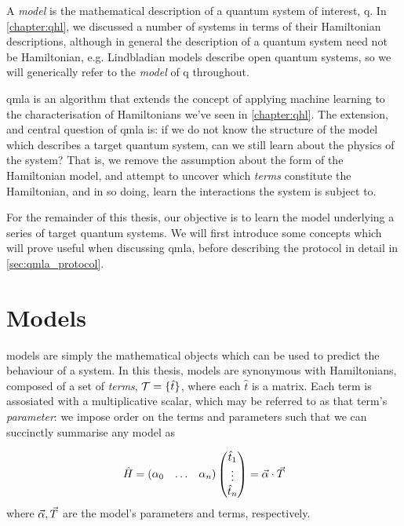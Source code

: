 \glsresetall

A \emph{model} is the mathematical description of a quantum system of interest, \gls{q}.
In \cref{chapter:qhl}, we discussed a number of systems in terms of their Hamiltonian descriptions,
    although in general the description of a quantum system need not be Hamiltonian, 
    e.g. Lindbladian models describe open quantum systems, 
    so we will generically refer to the \emph{\gls{model}} of \gls{q} throughout. 
\par 

\gls{qmla} is an algorithm that extends the concept of applying machine learning to the 
    characterisation of Hamiltonians we've seen in \cref{chapter:qhl}. 
The extension, and central question of \gls{qmla} is:
    if we do not know the structure of the model which describes a target quantum system, 
    can we still learn about the physics of the system?
That is, we remove the assumption about the form of the Hamiltonian model, 
    and attempt to uncover which \emph{\glspl{term}} constitute the Hamiltonian, 
    and in so doing, learn the interactions the system is subject to. 
\par 

For the remainder of this thesis, our objective is to learn the model underlying 
    a series of target quantum systems.
We will first introduce some concepts which will prove useful when discussing \gls{qmla}, 
    before describing the protocol in detail in \cref{sec:qmla_protocol}.


\section{Models}\label{sec:models}
\Glspl{model} are simply the mathematical objects which can be used to predict the behaviour of a system. 
In this thesis, \glspl{model} are synonymous with Hamiltonians,
    composed of a set of \emph{\glspl{term}}, $\mathcal{T} = \{ \hat{t} \}$, 
    where each $\hat{t}$ is a matrix. 
Each term is assosiated with a multiplicative scalar, which may be referred to as that term's \emph{parameter}: 
    we impose order on the terms and parameters such that we can succinctly summarise any model as 

\begin{align}
    \label{eqn:model}
    \begin{split}
        \hat{H} = \begin{matrix}(\alpha_0 & \dots & \alpha_n)\end{matrix} \left(\begin{matrix}\hat{t}_1 \\ \vdots \\ \hat{t}_n\end{matrix}\right) = \vec{\alpha} \cdot { \vec{T} } 
    \end{split}
\end{align}
    where $\vec{\alpha}, { \vec{T} }$ are the model's parameters and terms, respectively.

